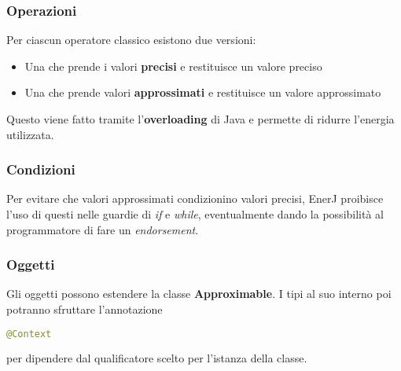 \subsubsection{Operazioni}
Per ciascun operatore classico esistono due versioni:
\begin{itemize}
	\item Una che prende i valori \textbf{precisi} e restituisce un valore preciso
	\item Una che prende valori \textbf{approssimati} e restituisce un valore approssimato
\end{itemize}
Questo viene fatto tramite l'\textbf{overloading} di Java e permette di ridurre l'energia utilizzata.

\subsubsection{Condizioni}
Per evitare che valori approssimati condizionino valori precisi, EnerJ proibisce l'uso di questi nelle guardie di \textit{if} e \textit{while}, eventualmente dando la possibilità al programmatore di fare un \textit{endorsement}.

\subsubsection{Oggetti}
Gli oggetti possono estendere la classe \textbf{Approximable}. I tipi al suo interno poi potranno sfruttare l'annotazione
\begin{lstlisting}[language=Java]
	@Context
\end{lstlisting}
per dipendere dal qualificatore scelto per l'istanza della classe.

